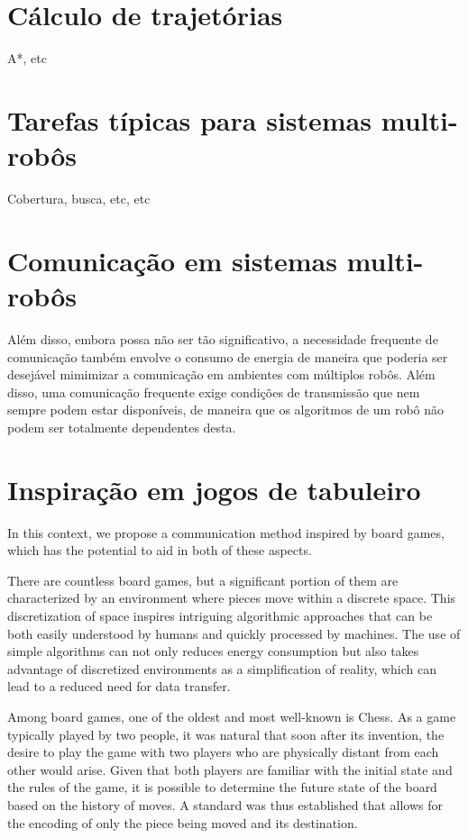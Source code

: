 \documentclass[eq,capa]{texufpel}
\begin{document}
\section{Cálculo de trajetórias}

A*, etc

\section{Tarefas típicas para sistemas multi-robôs}

Cobertura, busca, etc, etc

\section{Comunicação em sistemas multi-robôs}

Além disso, embora possa não ser tão significativo, a necessidade frequente de comunicação também envolve o consumo de energia de maneira que poderia ser desejável mimimizar a comunicação em ambientes com múltiplos robôs. Além disso, uma comunicação frequente exige condições de transmissão que nem sempre podem estar disponíveis, de maneira que os algoritmos de um robô não podem ser totalmente dependentes desta\cite{2021decentralized}\cite{2021smmr}. 

\section{Inspiração em jogos de tabuleiro}

In this context, we propose a communication method inspired by board games, which has the potential to aid in both of these aspects. 

There are countless board games, but a significant portion of them are characterized by an environment where pieces move within a discrete space\cite{boardgameshistory}. This discretization of space inspires intriguing algorithmic approaches that can be both easily understood by humans and quickly processed by machines. The use of simple algorithms can not only reduces energy consumption but also takes advantage of discretized environments as a simplification of reality, which can lead to a reduced need for data transfer.

Among board games, one of the oldest and most well-known is Chess\cite{boardgameshistory}. As a game typically played by two people, it was natural that soon after its invention, the desire to play the game with two players who are physically distant from each other would arise. Given that both players are familiar with the initial state and the rules of the game, it is possible to determine the future state of the board based on the history of moves. A standard was thus established that allows for the encoding of only the piece being moved and its destination\cite{xadrez}.
\end{document}
